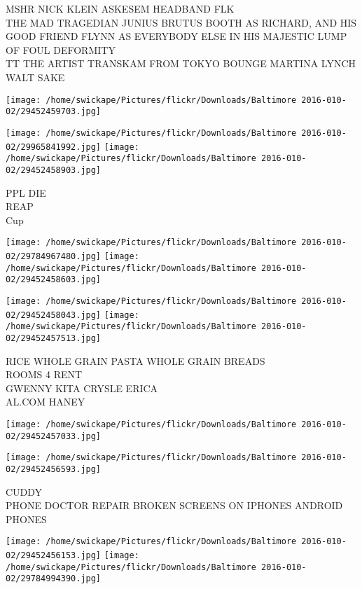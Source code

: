 \documentclass[10pt,letterpaper]{article}
\begin{document}
MSHR NICK KLEIN ASKESEM HEADBAND FLK\\
THE MAD TRAGEDIAN JUNIUS BRUTUS BOOTH AS RICHARD, AND HIS GOOD FRIEND FLYNN AS EVERYBODY ELSE IN HIS MAJESTIC LUMP OF FOUL DEFORMITY\\
TT THE ARTIST TRANSKAM FROM TOKYO BOUNGE MARTINA LYNCH\\
WALT SAKE\\
\pagebreak

\texttt{[image: /home/swickape/Pictures/flickr/Downloads/Baltimore 2016-010-02/29452459703.jpg]}

\vspace{0.25in}
\texttt{[image: /home/swickape/Pictures/flickr/Downloads/Baltimore 2016-010-02/29965841992.jpg]}
\texttt{[image: /home/swickape/Pictures/flickr/Downloads/Baltimore 2016-010-02/29452458903.jpg]}

PPL DIE\\
REAP\\
Cup\\
\pagebreak

\texttt{[image: /home/swickape/Pictures/flickr/Downloads/Baltimore 2016-010-02/29784967480.jpg]}
\texttt{[image: /home/swickape/Pictures/flickr/Downloads/Baltimore 2016-010-02/29452458603.jpg]}

\texttt{[image: /home/swickape/Pictures/flickr/Downloads/Baltimore 2016-010-02/29452458043.jpg]}
\texttt{[image: /home/swickape/Pictures/flickr/Downloads/Baltimore 2016-010-02/29452457513.jpg]}

RICE WHOLE GRAIN PASTA WHOLE GRAIN BREADS\\
ROOMS 4 RENT\\
GWENNY KITA CRYSLE ERICA\\
AL.COM HANEY\\
\pagebreak

\texttt{[image: /home/swickape/Pictures/flickr/Downloads/Baltimore 2016-010-02/29452457033.jpg]}

\vspace{0.25in}
\texttt{[image: /home/swickape/Pictures/flickr/Downloads/Baltimore 2016-010-02/29452456593.jpg]}

CUDDY\\
PHONE DOCTOR REPAIR BROKEN SCREENS ON IPHONES ANDROID PHONES\\
\pagebreak

\texttt{[image: /home/swickape/Pictures/flickr/Downloads/Baltimore 2016-010-02/29452456153.jpg]}
\texttt{[image: /home/swickape/Pictures/flickr/Downloads/Baltimore 2016-010-02/29784994390.jpg]}
\end{document}
